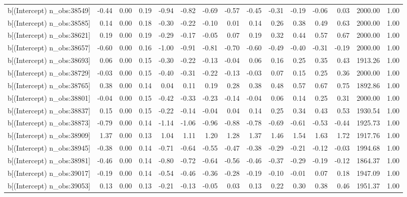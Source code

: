 \begin{table}[ht]
\begin{tabular}{rrrrrrrrrrrrrrr}
  b[(Intercept) n\_obs:38549] & -0.44 & 0.00 & 0.19 & -0.94 & -0.82 & -0.69 & -0.57 & -0.45 & -0.31 & -0.19 & -0.06 & 0.03 & 2000.00 & 1.00 \\ 
  b[(Intercept) n\_obs:38585] & 0.14 & 0.00 & 0.18 & -0.30 & -0.22 & -0.10 & 0.01 & 0.14 & 0.26 & 0.38 & 0.49 & 0.63 & 2000.00 & 1.00 \\ 
  b[(Intercept) n\_obs:38621] & 0.19 & 0.00 & 0.19 & -0.29 & -0.17 & -0.05 & 0.07 & 0.19 & 0.32 & 0.44 & 0.57 & 0.67 & 2000.00 & 1.00 \\ 
  b[(Intercept) n\_obs:38657] & -0.60 & 0.00 & 0.16 & -1.00 & -0.91 & -0.81 & -0.70 & -0.60 & -0.49 & -0.40 & -0.31 & -0.19 & 2000.00 & 1.00 \\ 
  b[(Intercept) n\_obs:38693] & 0.06 & 0.00 & 0.15 & -0.30 & -0.22 & -0.13 & -0.04 & 0.06 & 0.16 & 0.25 & 0.35 & 0.43 & 1913.26 & 1.00 \\ 
  b[(Intercept) n\_obs:38729] & -0.03 & 0.00 & 0.15 & -0.40 & -0.31 & -0.22 & -0.13 & -0.03 & 0.07 & 0.15 & 0.25 & 0.36 & 2000.00 & 1.00 \\ 
  b[(Intercept) n\_obs:38765] & 0.38 & 0.00 & 0.14 & 0.04 & 0.11 & 0.19 & 0.28 & 0.38 & 0.48 & 0.57 & 0.67 & 0.75 & 1892.86 & 1.00 \\ 
  b[(Intercept) n\_obs:38801] & -0.04 & 0.00 & 0.15 & -0.42 & -0.33 & -0.23 & -0.14 & -0.04 & 0.06 & 0.14 & 0.25 & 0.31 & 2000.00 & 1.00 \\ 
  b[(Intercept) n\_obs:38837] & 0.15 & 0.00 & 0.15 & -0.22 & -0.14 & -0.04 & 0.04 & 0.14 & 0.25 & 0.34 & 0.43 & 0.53 & 1930.54 & 1.00 \\ 
  b[(Intercept) n\_obs:38873] & -0.79 & 0.00 & 0.14 & -1.14 & -1.06 & -0.96 & -0.88 & -0.78 & -0.69 & -0.61 & -0.53 & -0.44 & 1925.73 & 1.00 \\ 
  b[(Intercept) n\_obs:38909] & 1.37 & 0.00 & 0.13 & 1.04 & 1.11 & 1.20 & 1.28 & 1.37 & 1.46 & 1.54 & 1.63 & 1.72 & 1917.76 & 1.00 \\ 
  b[(Intercept) n\_obs:38945] & -0.38 & 0.00 & 0.14 & -0.71 & -0.64 & -0.55 & -0.47 & -0.38 & -0.29 & -0.21 & -0.12 & -0.03 & 1994.68 & 1.00 \\ 
  b[(Intercept) n\_obs:38981] & -0.46 & 0.00 & 0.14 & -0.80 & -0.72 & -0.64 & -0.56 & -0.46 & -0.37 & -0.29 & -0.19 & -0.12 & 1864.37 & 1.00 \\ 
  b[(Intercept) n\_obs:39017] & -0.19 & 0.00 & 0.14 & -0.54 & -0.46 & -0.36 & -0.28 & -0.19 & -0.10 & -0.01 & 0.07 & 0.18 & 1947.09 & 1.00 \\ 
  b[(Intercept) n\_obs:39053] & 0.13 & 0.00 & 0.13 & -0.21 & -0.13 & -0.05 & 0.03 & 0.13 & 0.22 & 0.30 & 0.38 & 0.46 & 1951.37 & 1.00 \\ 

\end{tabular}
\end{table}
